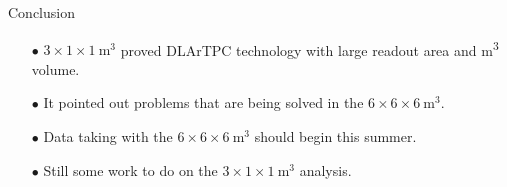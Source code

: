 \documentclass[10pt]{beamer}
\begin{document}
    \begin{frame}{Conclusion}
    	\begin{normalsize}
	    	\begin{itemize}
	    		\item[$\bullet$] $3 \times 1 \times \SI{1}{\meter\cubed}$ proved DLArTPC technology with large readout area and \si{\meter\cubed} volume.
	    		\item[$\bullet$] It pointed out problems that are being solved in the $6 \times 6 \times \SI{6}{\meter\cubed}$.
	    		\item[$\bullet$] Data taking with the $6 \times 6 \times \SI{6}{\meter\cubed}$ should begin this summer.
	    		\item[$\bullet$] Still some work to do on the $3 \times 1 \times \SI{1}{\meter\cubed}$ analysis.
	    	\end{itemize}
    	\end{normalsize}
    \end{frame}
    
\end{document}
